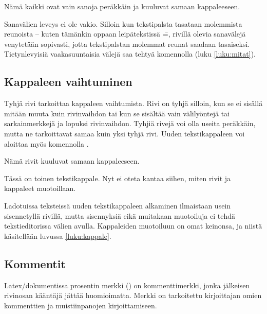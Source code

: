 \begin{tulossis}
  Nämä kaikki ovat vain sanoja peräkkäin ja kuuluvat samaan
  kappaleeseen.
\end{tulossis}

Sanavälien leveys ei ole vakio. Silloin kun tekstipalsta tasataan
molemmista reunoista -- kuten tämänkin oppaan leipätekstissä \==,
rivillä olevia sanavälejä venytetään sopivasti, jotta tekstipalstan
molemmat reunat saadaan tasaiseksi. Tietynlevyisiä vaakasuuntaisia
välejä saa tehtyä komennolla  (luku
\ref{luku:mitat}).

\subsection{Kappaleen vaihtuminen}

Tyhjä rivi tarkoittaa kappaleen vaihtumista. Rivi on tyhjä silloin, kun
se ei sisällä mitään muuta kuin rivinvaihdon tai kun se sisältää vain
välilyöntejä tai sarkainmerkkejä ja lopuksi rivinvaihdon. Tyhjiä rivejä
voi olla useita peräkkäin, mutta ne tarkoittavat samaa kuin yksi tyhjä
rivi. Uuden tekstikappaleen voi aloittaa myös komennolla .

\begin{koodilohkosis}
  Nämä rivit kuuluvat
  samaan kappaleeseen.

  Tässä on toinen tekstikappale.
  Nyt ei oteta kantaa siihen, miten
  rivit ja kappaleet muotoillaan.
\end{koodilohkosis}

Ladotuissa teksteissä uuden tekstikappaleen alkaminen ilmaistaan usein
sisennetyllä rivillä, mutta sisennyksiä eikä muitakaan muotoiluja ei
tehdä tekstieditorissa välien avulla. Kappaleiden muotoiluun on omat
keinonsa, ja niistä käsitellään luvussa \ref{luku:kappale}.

\subsection{Kommentit}

Latex\-/dokumentissa prosentin merkki (\koodi{\%}) on kommenttimerkki,
jonka jälkeisen rivin\-osan kääntäjä jättää huomioimatta. Merkki on
tarkoitettu kirjoittajan omien kommenttien ja muistiinpanojen
kirjoittamiseen.

\begin{koodilohkosis}
\end{koodilohkosis}

